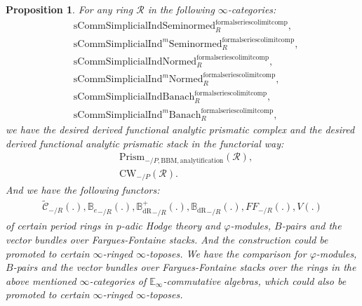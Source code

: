 \documentclass[12pt]{book}
\newtheorem{proposition}{Proposition}
\begin{document}
\begin{proposition}
For any ring $\mathcal{R}$ in the following $\infty$-categories:
\begin{align}
&\mathrm{sComm}\mathrm{Simplicial}\mathrm{Ind}\mathrm{Seminormed}^\mathrm{formalseriescolimitcomp}_R,\\
&\mathrm{sComm}\mathrm{Simplicial}\mathrm{Ind}^m\mathrm{Seminormed}^\mathrm{formalseriescolimitcomp}_R,\\
&\mathrm{sComm}\mathrm{Simplicial}\mathrm{Ind}\mathrm{Normed}^\mathrm{formalseriescolimitcomp}_R,\\
&\mathrm{sComm}\mathrm{Simplicial}\mathrm{Ind}^m\mathrm{Normed}^\mathrm{formalseriescolimitcomp}_R,\\
&\mathrm{sComm}\mathrm{Simplicial}\mathrm{Ind}\mathrm{Banach}^\mathrm{formalseriescolimitcomp}_R,\\
&\mathrm{sComm}\mathrm{Simplicial}\mathrm{Ind}^m\mathrm{Banach}^\mathrm{formalseriescolimitcomp}_R,	
\end{align}	
we have the desired derived functional analytic prismatic complex and the desired derived functional analytic prismatic stack in the functorial way:
\begin{align}
&\mathrm{Prism}_{-/P,\mathrm{BBM},\mathrm{analytification}}(\mathcal{R}),\\
&\mathrm{CW}_{-/P}(\mathcal{R}).
\end{align}
And we have the following functors: 
\begin{align}
\widetilde{\mathcal{C}}_{-/R}(.),{\mathbb{B}_e}_{-/R}(.),{\mathbb{B}_\mathrm{dR}^+}_{-/R}(.),{\mathbb{B}_\mathrm{dR}}_{-/R}(.),{FF}_{-/R}(.),V(.)
\end{align}
of certain period rings in $p$-adic Hodge theory and $\varphi$-modules, $B$-pairs and the vector bundles over Fargues-Fontaine stacks. And the construction could be promoted to certain $\infty$-ringed $\infty$-toposes. We have the comparison for $\varphi$-modules, $B$-pairs and the vector bundles over Fargues-Fontaine stacks over the rings in the above mentioned $\infty$-categories of $\mathbb{E}_\infty$-commutative algebras, which could also be promoted to certain $\infty$-ringed $\infty$-toposes.
\end{proposition}
\end{document}
